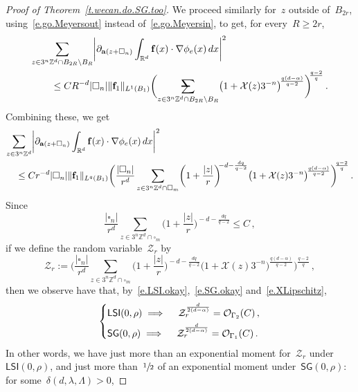\documentclass[11pt]{article} %
\makeatletter
\let\oldsquare\square %
\renewcommand{\square}{\oldsquare}
\numberwithin{equation}{section}
\theoremstyle{definition}
\let\originalleft\left
\let\originalright\right
\renewcommand{\left}{\mathopen{}\mathclose\bgroup\originalleft}
\renewcommand{\right}{\aftergroup\egroup\originalright}
\newcommand*{\Zd}{\ensuremath{\mathbb{Z}^d}}
\newcommand*{\Rd}{\ensuremath{\mathbb{R}^d}}
\newcommand{\f}{\mathbf{f}}
\renewcommand{\a}{\mathbf{a}}
\newcommand{\cu}{\square}
\newcommand{\X}{\mathcal{X}}
\renewcommand{\O}{\mathcal{O}}
\newcommand{\avsum}{\mathop{\mathpalette\avsuminner\relax}\displaylimits}
\newcommand\avsuminner[2]{%
  {\sbox0{$\m@th#1\sum$}%
   \vphantom{\usebox0}%
   \ooalign{%
     \hidewidth
     \smash{\,\rule[.23em]{8.8pt}{1.1pt} \relax}%
     \hidewidth\cr
     $\m@th#1\sum$\cr
   }%
  }%
}
\newcommand{\LSI}{\mathsf{LSI}}
\newcommand{\SG}{\mathsf{SG}}
\makeatother
\begin{document}
\begin{proof}[{Proof of Theorem~\ref{t.wecan.do.SG.too}}]
We proceed similarly for~$z$ outside of~$B_{2r}$, using~\eqref{e.go.Meyersout} instead of~\eqref{e.go.Meyersin}, to get, for every~$R\geq 2r$, 
\begin{align*}
\lefteqn{ \sum_{z\in 3^n\Zd\cap B_{2R} \setminus B_R} \left|  \partial_{\a(z+\cu_n)} \int_{\Rd} \f(x)\cdot \nabla \phi_e(x)\,dx
\right|^2
} \qquad & 
\notag \\ & 
\leq
CR^{-d}  |\cu_n|  \| \f_1\|_{L^1(B_1)} 
\biggl( \avsum_{z\in 3^n\Zd\cap B_{2R} \setminus B_R}
\bigl(1+\X(z) 3^{-n} \bigr)^{\! \frac{q(d-\alpha)}{q-2}}
\biggr)^{\!\!\frac{q-2}{q} }
\,.
\end{align*}
Combining these, we get
\begin{align*}
\lefteqn{ \sum_{z\in 3^n\Zd} \left|  \partial_{\a(z+\cu_n)} \int_{\Rd} \f(x)\cdot \nabla \phi_e(x)\,dx
\right|^2
} \quad & 
\notag \\ & 
\leq
C r^{-d} |\cu_n|  \| \f_1\|_{L^q(B_1)} 
\biggl( 
\frac{|\cu_n|}{r^d}
\sum_{z\in 3^n\Zd\cap \cu_m}
\biggl( 1+ 
\frac{|z|}{r} 
\biggr)^{\!\!-d-\frac{dq}{q-2}}
\bigl(1+\X(z) 3^{-n} \bigr)^{\! \frac{q(d-\alpha)}{q-2}}
\biggr)^{\!\!\frac{q-2}{q} }
\,.
\end{align*}
Since 
\begin{equation*}
\frac{|\cu_n|}{r^d}
\sum_{z\in 3^n\Zd\cap \cu_m}
\biggl( 1+ 
\frac{|z|}{r} 
\biggr)^{\!\!-d-\frac{dq}{q-2}}  \leq C\,,
\end{equation*}
if we define the random variable~$\mathcal{Z}_r$ by
\begin{equation*}
\mathcal{Z}_r
:= 
\biggl( 
\frac{|\cu_n|}{r^d}
\sum_{z\in 3^n\Zd\cap \cu_m}
\biggl( 1+ 
\frac{|z|}{r} 
\biggr)^{\!\!-d-\frac{dq}{q-2}}
\bigl(1+\X(z) 3^{-n} \bigr)^{\! \frac{q(d-\alpha)}{q-2}}
\biggr)^{\!\!\frac{q-2}{q} }\,,
\end{equation*}
then we observe have that, by~\eqref{e.LSI.okay},~\eqref{e.SG.okay} and~\eqref{e.XLipschitz},
\begin{equation*}
\left\{
\begin{aligned}
& \LSI(0,\rho) 
\implies \quad 
\mathcal{Z}_r^{\frac{d}{2(d-\alpha)}  } 
= 
\O_{\Gamma_2}(C)\,, \\
& 
\SG(0,\rho) 
\implies \quad 
\mathcal{Z}_r^{\frac{d}{2(d-\alpha)}  } 
= 
\O_{\Gamma_1}(C) \,.
\end{aligned}
\right.
\end{equation*}
In other words, we have just more than an exponential moment for~$\mathcal{Z}_r$ under~$\LSI(0,\rho)$, and just more than~$\sfrac12$ of an exponential moment under~$\SG(0,\rho)$: for some~$\delta(d,\lambda,\Lambda)>0$,

\end{proof}
\end{document}
